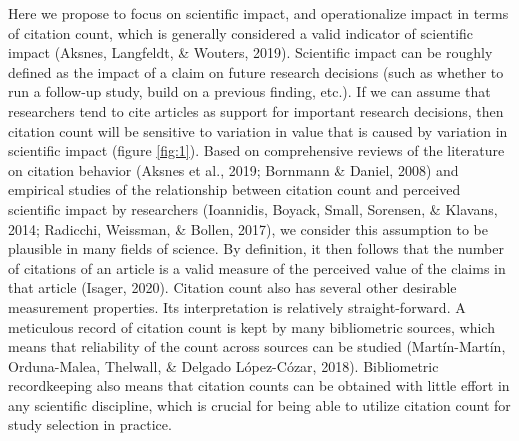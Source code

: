 \documentclass[
  english,
  jou,floatsintext]{apa6}
\begin{document}
Here we propose to focus on scientific impact, and operationalize impact in terms of citation count, which is generally considered a valid indicator of scientific impact (Aksnes, Langfeldt, \& Wouters, 2019). Scientific impact can be roughly defined as the impact of a claim on future research decisions (such as whether to run a follow-up study, build on a previous finding, etc.). If we can assume that researchers tend to cite articles as support for important research decisions, then citation count will be sensitive to variation in value that is caused by variation in scientific impact (figure \ref{fig:1}). Based on comprehensive reviews of the literature on citation behavior (Aksnes et al., 2019; Bornmann \& Daniel, 2008) and empirical studies of the relationship between citation count and perceived scientific impact by researchers (Ioannidis, Boyack, Small, Sorensen, \& Klavans, 2014; Radicchi, Weissman, \& Bollen, 2017), we consider this assumption to be plausible in many fields of science. By definition, it then follows that the number of citations of an article is a valid measure of the perceived value of the claims in that article (Isager, 2020). Citation count also has several other desirable measurement properties. Its interpretation is relatively straight-forward. A meticulous record of citation count is kept by many bibliometric sources, which means that reliability of the count across sources can be studied (Martín-Martín, Orduna-Malea, Thelwall, \& Delgado López-Cózar, 2018). Bibliometric recordkeeping also means that citation counts can be obtained with little effort in any scientific discipline, which is crucial for being able to utilize citation count for study selection in practice.
\end{document}
